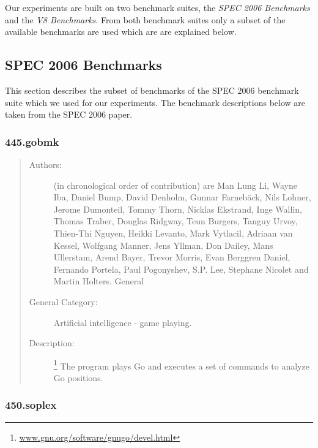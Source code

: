 \documentclass[onecolumn, openright, master, english, signatures]{dbrgrptt}
\begin{document}
Our experiments are built on two benchmark suites, the \emph{SPEC 2006 Benchmarks}\cite{henning2006spec} and the \emph{V8 Benchmarks}\cite{v8benchmarks}. From both benchmark suites only a subset of the available benchmarks are used which are are explained below.

\subsection{SPEC 2006 Benchmarks}

This section describes the subset of benchmarks of the SPEC 2006 benchmark suite \cite{henning2006spec} which we used for our experiments. The benchmark descriptions below are taken from the SPEC 2006 paper.

\subsubsection{445.gobmk}

\begin{quote}
\begin{description}
\item[Authors:] (in chronological order of contribution) are Man Lung Li, Wayne Iba, Daniel Bump, David Denholm, Gunnar Farneb\"ack, Nils Lohner, Jerome Dumonteil, Tommy Thorn, Nicklas Ekstrand, Inge Wallin, Thomas Traber, Douglas Ridgway, Teun Burgers, Tanguy Urvoy, Thien-Thi Nguyen, Heikki Levanto, Mark Vytlacil, Adriaan van Kessel, Wolfgang Manner, Jens Yllman, Don Dailey, Mans Ullerstam, Arend Bayer, Trevor Morris, Evan Berggren Daniel, Fernando Portela, Paul Pogonyshev, S.P. Lee, Stephane Nicolet and Martin Holters. General

\item[General Category:] Artificial intelligence - game playing.

\item[Description:]\footnote{\url{www.gnu.org/software/gnugo/devel.html}} The program plays Go and executes a set of commands to analyze Go positions.
\end{description}
\end{quote}

\subsubsection{450.soplex}
\end{document}
